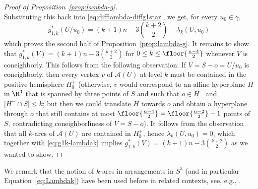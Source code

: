 \begin{proof}[Proof of Proposition~\ref{prop:lambda-g}]
\begin{equation}
\end{equation}
Substituting this back into \eqref{eq:difflambda-diffg1star}, we get, for every $u_0\in \gamma$,
\begin{equation}
\label{eq:g1k-lambdak}
g^*_{1,k}(U/u_0) = (k+1)n-3\binom{k+2}{2} - \lambda_k(U,u_0)
\end{equation}
which proves the second half of Proposition~\ref{prop:lambda-g}.
%
It remains to show that $g^*_{1,k}(V)= (k+1)n-3\binom{k+2}{2}$ for $0\leq k\leq \floor{\frac{n-4}{2}}$ whenever $V$ is coneighborly. This follows from the following observation: If  $V=S-o=U/u_0$ is coneighborly, then every vertex $v$ of $\mathcal{A}(U)$ at level $k$ must be contained in the positive hemisphere $H_0^+$ (otherwise, $v$ would correspond to an affine hyperplane $H$ in $\R^3$ that is spanned by three points of $S$ and such that $o\in H^-$ and $|H^-\cap S|\leq k$; but then we could translate $H$ towards $o$ and obtain a hyperplane through $o$ that still contains at most $\floor{\frac{n-4}{2}}= \floor{\frac{n-2}{2}}-1$ points of $S$, contradicting coneighborliness of $V=S-o$). It follows from the observation that all $k$-arcs of $\mathcal{A}(U)$ are contained in $H_0^+$, hence $\lambda_k(U,u_0)=0$, which together with \eqref{eq:g1k-lambdak} implies 
$g^*_{1,k}(V)= (k+1)n-3\binom{k+2}{2}$ as we wanted to show.
\end{proof}
%
We remark that the notion of $k$-arcs in arrangements in $S^3$ (and in particular Equation~\eqref{eq:Lambdak}) have been used before in related contexts, see, e.g., \cite{Edelsbrunner:1989aa,Ramos:2009aa}. 
%
%
\appendix

